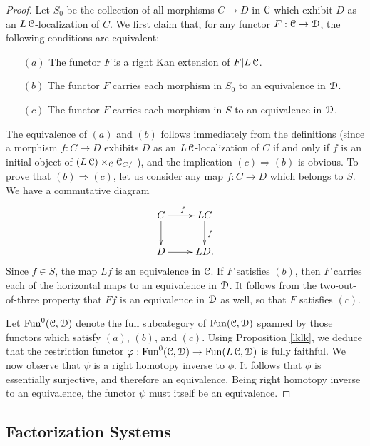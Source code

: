 \begin{proof}
Let $S_0$ be the collection of all morphisms $C \rightarrow D$ in $\operatorname{\mathcal{C}}$ which exhibit
$D$ as an $L\operatorname{\mathcal{C}}$-localization of $C$. We first claim that, for any functor
$F: \operatorname{\mathcal{C}} \rightarrow \operatorname{\mathcal{D}}$, the following conditions are equivalent:
\begin{itemize}
\item[$(a)$] The functor $F$ is a right Kan extension of $F | L\operatorname{\mathcal{C}}$.
\item[$(b)$] The functor $F$ carries each morphism in $S_0$ to an equivalence in $\operatorname{\mathcal{D}}$.
\item[$(c)$] The functor $F$ carries each morphism in $S$ to an equivalence in $\operatorname{\mathcal{D}}$.
\end{itemize}

The equivalence of $(a)$ and $(b)$ follows immediately from the definitions
(since a morphism $f: C \rightarrow D$ exhibits $D$ as an $L \operatorname{\mathcal{C}}$-localization
of $C$ if and only if $f$ is an initial object of $(L \operatorname{\mathcal{C}}) \times_{\operatorname{\mathcal{C}}} \operatorname{\mathcal{C}}_{C/}$ ), and the
implication $(c) \Rightarrow (b)$ is obvious. To prove that $(b) \Rightarrow (c)$, let us
consider any map $f: C \rightarrow D$ which belongs to $S$. We have a commutative diagram
$$ \xymatrix{ C \ar[r]^{f} \ar[d] & LC \ar[d]^{f} \\
D \ar[r] & LD. }$$
Since $f \in S$, the map $Lf$ is an equivalence in $\operatorname{\mathcal{C}}$. If $F$ satisfies $(b)$, then $F$ carries
each of the horizontal maps to an equivalence in $\operatorname{\mathcal{D}}$. It follows from the two-out-of-three property that $Ff$ is an equivalence in $\operatorname{\mathcal{D}}$ as well, so that $F$ satisfies $(c)$.

Let $\operatorname{Fun}^{0}(\operatorname{\mathcal{C}}, \operatorname{\mathcal{D}})$ denote the full subcategory of $\operatorname{Fun}(\operatorname{\mathcal{C}}, \operatorname{\mathcal{D}})$ spanned by those functors which satisfy $(a)$, $(b)$, and $(c)$. Using Proposition \ref{lklk}, we deduce
that the restriction functor $\varphi: \operatorname{Fun}^{0}(\operatorname{\mathcal{C}}, \operatorname{\mathcal{D}}) \rightarrow \operatorname{Fun}( L \operatorname{\mathcal{C}}, \operatorname{\mathcal{D}})$ is fully faithful.
We now observe that $\psi$ is a right homotopy inverse to $\phi$. It follows that
$\phi$ is essentially surjective, and therefore an equivalence. Being right homotopy inverse to an equivalence, the functor $\psi$ must itself be an equivalence.
\end{proof}

\subsection{Factorization Systems}\label{factgen1}


